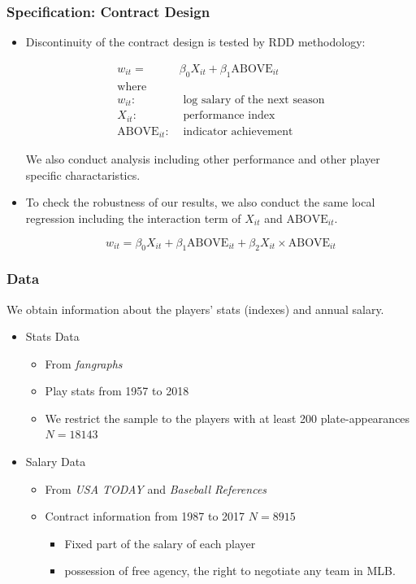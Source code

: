 \documentclass[dvipdfmx,12pt]{beamer}
\begin{document}
\begin{frame}\frametitle{Specification: Contract Design}
  \begin{itemize}
    \small
    \item Discontinuity of the contract design is tested by RDD methodology:

    \begin{align*}
      w_{it} = & \beta_0 X_{it} + \beta_1 \text{ABOVE}_{it} \\
      \text{where} \\
      w_{it}: & \text{ log salary of the next season} \\
      X_{it}: & \text{ performance index} \\
      \text{ABOVE}_{it}: & \text{ indicator achievement}
    \end{align*}

    We also conduct analysis including other performance and other player specific charactaristics.

    \item To check the robustness of our results, we also conduct the same local regression including the interaction term of $X_{it}$ and $\text{ABOVE}_{it}$.

    \[
    w_{it} = \beta_0 X_{it} + \beta_1 \text{ABOVE}_{it} + \beta_2 X_{it} \times \text{ABOVE}_{it}
    \]

  \end{itemize}
\end{frame}

\begin{frame}\frametitle{Data}
  We obtain information about the players' stats (indexes) and annual salary.
  \begin{itemize}
    \item Stats Data
    \begin{itemize}
      \item From \textit{fangraphs}

      \item Play stats from 1957 to 2018

      \item We restrict the sample to the players with at least 200 plate-appearances $N=18143$
    \end{itemize}
    \item Salary Data
    \begin{itemize}
      \item From \textit{USA TODAY} and \textit{Baseball References}

      \item Contract information from 1987 to 2017 $N=8915$
      \begin{itemize}
        \item Fixed part of the salary of each player

        \item possession of free agency, the right to negotiate any team in MLB.
      \end{itemize}
    \end{itemize}
  \end{itemize}
\end{frame}
\end{document}
